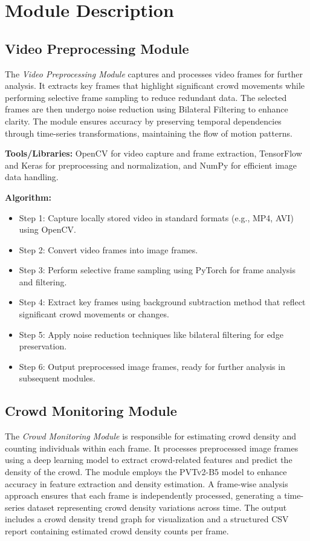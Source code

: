 \documentclass[11pt]{report}
\begin{document}
\section{Module Description}

\subsection{Video Preprocessing Module}
The \textit{Video Preprocessing Module} captures and processes video frames for further analysis. It extracts key frames that highlight significant crowd movements while performing selective frame sampling to reduce redundant data. The selected frames are then undergo noise reduction using Bilateral Filtering to enhance clarity. The module ensures accuracy by preserving temporal dependencies through time-series transformations, maintaining the flow of motion patterns.

\textbf{Tools/Libraries:} OpenCV for video capture and frame extraction, TensorFlow and Keras for preprocessing and normalization, and NumPy for efficient image data handling.

\textbf{Algorithm:}
\begin{itemize}
  \item Step 1: Capture locally stored video in standard formats (e.g., MP4, AVI) using OpenCV.
  \item Step 2: Convert video frames into image frames.
  \item Step 3: Perform selective frame sampling using PyTorch for frame analysis and filtering.
  \item Step 4: Extract key frames using background subtraction method that reflect significant crowd movements or changes.

  \item Step 5: Apply noise reduction techniques like bilateral filtering for edge preservation.
  \item Step 6: Output preprocessed image frames, ready for further analysis in subsequent modules.
\end{itemize}

\subsection{Crowd Monitoring Module}
The \textit{Crowd Monitoring Module} is responsible for estimating crowd density and counting individuals within each frame. It processes preprocessed image frames using a deep learning model to extract crowd-related features and predict the density of the crowd. The module employs the PVTv2-B5 model to enhance accuracy in feature extraction and density estimation. A frame-wise analysis approach ensures that each frame is independently processed, generating a time-series dataset representing crowd density variations across time. The output includes a crowd density trend graph for visualization and a structured CSV report containing estimated crowd density counts per frame.
\end{document}
